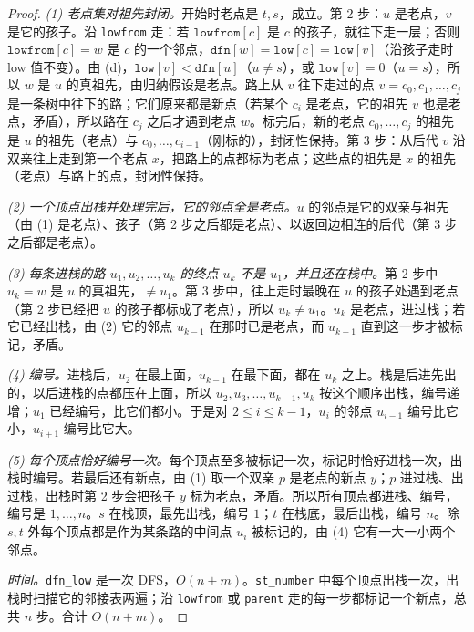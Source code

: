 \begin{proof}
\emph{(1) 老点集对祖先封闭。}开始时老点是 $t,s$，成立。第 2 步：$u$ 是老点，$v$ 是它的孩子。沿 \texttt{lowfrom} 走：若 $\texttt{lowfrom}[c]$ 是 $c$ 的孩子，就往下走一层；否则 $\texttt{lowfrom}[c]=w$ 是 $c$ 的一个邻点，$\texttt{dfn}[w]=\texttt{low}[c]=\texttt{low}[v]$（沿孩子走时 low 值不变）。由 (d)，$\texttt{low}[v]<\texttt{dfn}[u]$（$u\neq s$），或 $\texttt{low}[v]=0$（$u=s$），所以 $w$ 是 $u$ 的真祖先，由归纳假设是老点。路上从 $v$ 往下走过的点 $v=c_0,c_1,\dots,c_j$ 是一条树中往下的路；它们原来都是新点（若某个 $c_i$ 是老点，它的祖先 $v$ 也是老点，矛盾），所以路在 $c_j$ 之后才遇到老点 $w$。标完后，新的老点 $c_0,\dots,c_j$ 的祖先是 $u$ 的祖先（老点）与 $c_0,\dots,c_{i-1}$（刚标的），封闭性保持。第 3 步：从后代 $v$ 沿双亲往上走到第一个老点 $x$，把路上的点都标为老点；这些点的祖先是 $x$ 的祖先（老点）与路上的点，封闭性保持。

\emph{(2) 一个顶点出栈并处理完后，它的邻点全是老点。}$u$ 的邻点是它的双亲与祖先（由 (1) 是老点）、孩子（第 2 步之后都是老点）、以返回边相连的后代（第 3 步之后都是老点）。

\emph{(3) 每条进栈的路 $u_1,u_2,\dots,u_k$ 的终点 $u_k$ 不是 $u_1$，并且还在栈中。}第 2 步中 $u_k=w$ 是 $u$ 的真祖先，$\neq u_1$。第 3 步中，往上走时最晚在 $u$ 的孩子处遇到老点（第 2 步已经把 $u$ 的孩子都标成了老点），所以 $u_k\neq u_1$。$u_k$ 是老点，进过栈；若它已经出栈，由 (2) 它的邻点 $u_{k-1}$ 在那时已是老点，而 $u_{k-1}$ 直到这一步才被标记，矛盾。

\emph{(4) 编号。}进栈后，$u_2$ 在最上面，$u_{k-1}$ 在最下面，都在 $u_k$ 之上。栈是后进先出的，以后进栈的点都压在上面，所以 $u_2,u_3,\dots,u_{k-1},u_k$ 按这个顺序出栈，编号递增；$u_1$ 已经编号，比它们都小。于是对 $2\leqslant i\leqslant k-1$，$u_i$ 的邻点 $u_{i-1}$ 编号比它小，$u_{i+1}$ 编号比它大。

\emph{(5) 每个顶点恰好编号一次。}每个顶点至多被标记一次，标记时恰好进栈一次，出栈时编号。若最后还有新点，由 (1) 取一个双亲 $p$ 是老点的新点 $y$；$p$ 进过栈、出过栈，出栈时第 2 步会把孩子 $y$ 标为老点，矛盾。所以所有顶点都进栈、编号，编号是 $1,\dots,n$。$s$ 在栈顶，最先出栈，编号 $1$；$t$ 在栈底，最后出栈，编号 $n$。除 $s,t$ 外每个顶点都是作为某条路的中间点 $u_i$ 被标记的，由 (4) 它有一大一小两个邻点。

\emph{时间。}\texttt{dfn\_low} 是一次 DFS，$O(n+m)$。\texttt{st\_number} 中每个顶点出栈一次，出栈时扫描它的邻接表两遍；沿 \texttt{lowfrom} 或 \texttt{parent} 走的每一步都标记一个新点，总共 $n$ 步。合计 $O(n+m)$。
\end{proof}

